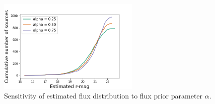 \begin{figure}
    \centering
    \includegraphics[width = 0.6\textwidth]{figures/prior_sensitivity/sensitivity_cdf_fluxes.png}
    \caption{Sensitivity of estimated flux distribution to flux prior parameter $\alpha$.}
    \label{fig:cdf_sensitivity}
\end{figure}
